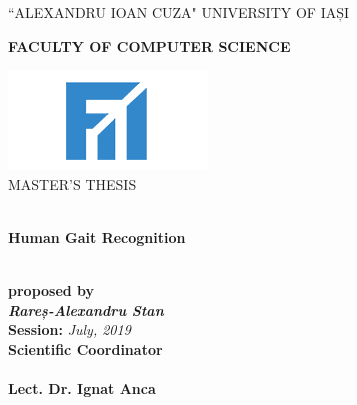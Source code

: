 \documentclass[12pt]{article}
\theoremstyle{definition}
\begin{document}
	\begin{titlepage}
		\begin{center}
			\vspace{1cm}
			``ALEXANDRU IOAN CUZA" UNIVERSITY OF IAȘI
			\
			\\
			\begin{large}
				\textbf{FACULTY OF COMPUTER SCIENCE}\\
			\end{large}
			\vspace{2.5cm}
			\includegraphics{fii.png}
			\
			\\
			\vspace{1cm}
			MASTER'S THESIS
			\begin{large}
				\
				\\
				\vspace{1.5cm}
				\textbf{Human Gait Recognition}
			\end{large}
			\\
			\vspace{1.5cm}
			\textbf{proposed by}
			\\
			\vspace{1.5cm}
			\textit{\textbf{Rareș-Alexandru Stan}}
			\\
			\vspace{2cm}
			\textbf{Session:} \textit{July, 2019}
			\\
			\vspace{1.5cm}
			\textbf{Scientific Coordinator}
			\
			\\
			\
			\\
			\textbf{Lect. Dr. Ignat Anca}

		\end{center}
	\end{titlepage}
	\newpage
\end{document}
